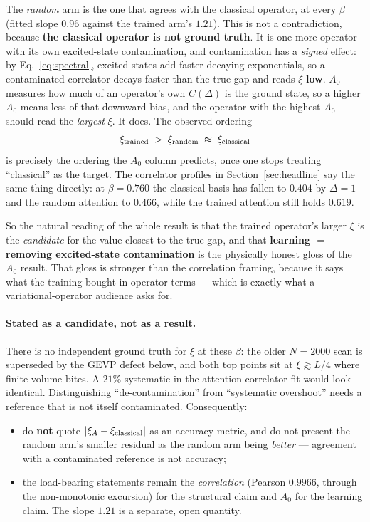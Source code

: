 \documentclass[11pt,a4paper]{article}
\newcommand{\xiA}{\xi_A}
\begin{document}
The \emph{random} arm is the one that agrees with the classical operator, at
every $\beta$ (fitted slope $0.96$ against the trained arm's $1.21$). This is
not a contradiction, because \textbf{the classical operator is not ground
truth}. It is one more operator with its own excited-state contamination, and
contamination has a \emph{signed} effect: by Eq.~\eqref{eq:spectral}, excited
states add faster-decaying exponentials, so a contaminated correlator decays
faster than the true gap and reads $\xi$ \textbf{low}. $A_0$ measures how much
of an operator's own $C(\Delta)$ is the ground state, so a higher $A_0$ means
less of that downward bias, and the operator with the highest $A_0$ should read
the \emph{largest} $\xi$. It does. The observed ordering
\begin{equation}
  \xi_{\rm trained} \;>\; \xi_{\rm random} \;\approx\; \xi_{\rm classical}
\end{equation}
is precisely the ordering the $A_0$ column predicts, once one stops treating
``classical'' as the target. The correlator profiles in
Section~\ref{sec:headline} say the same thing directly: at $\beta=0.760$ the
classical basis has fallen to $0.404$ by $\Delta=1$ and the random attention to
$0.466$, while the trained attention still holds $0.619$.

So the natural reading of the whole result is that the trained operator's larger
$\xi$ is the \emph{candidate} for the value closest to the true gap, and that
\textbf{learning $=$ removing excited-state contamination} is the physically
honest gloss of the $A_0$ result. That gloss is stronger than the correlation
framing, because it says what the training bought in operator terms --- which is
exactly what a variational-operator audience asks for.

\paragraph{Stated as a candidate, not as a result.} There is no independent
ground truth for $\xi$ at these $\beta$: the older $N=2000$ scan is superseded
by the GEVP defect below, and both top points sit at $\xi \gtrsim L/4$ where
finite volume bites. A $21\%$ systematic in the attention correlator fit would
look identical. Distinguishing ``de-contamination'' from ``systematic
overshoot'' needs a reference that is not itself contaminated. Consequently:
\begin{itemize}
  \item do \textbf{not} quote $|\xiA - \xi_{\rm classical}|$ as an accuracy
        metric, and do not present the random arm's smaller residual as the
        random arm being \emph{better} --- agreement with a contaminated
        reference is not accuracy;
  \item the load-bearing statements remain the \emph{correlation} (Pearson
        $0.9966$, through the non-monotonic excursion) for the structural claim
        and $A_0$ for the learning claim. The slope $1.21$ is a separate, open
        quantity.
\end{itemize}
\end{document}
